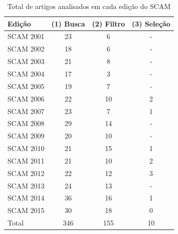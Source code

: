 \begin{table}[H]
\caption{Total de artigos analisados em cada edição do SCAM}
\centering
\begin{tabular}{| l | c | c | c |}
\hline
Edição & (1) Busca & (2) Filtro & (3) Seleção \\
\hline
SCAM 2001 & 23    & 6         & -           \\
SCAM 2002 & 18    & 6         & -           \\
SCAM 2003 & 21    & 8         & -           \\
SCAM 2004 & 17    & 3         & -           \\
SCAM 2005 & 19    & 7         & -           \\
SCAM 2006 & 22    & 10        & 2           \\
SCAM 2007 & 23    & 7         & 1           \\
SCAM 2008 & 29    & 14        & -           \\
SCAM 2009 & 20    & 10        & -           \\
SCAM 2010 & 21    & 15        & 1           \\
SCAM 2011 & 21    & 10        & 2           \\
SCAM 2012 & 22    & 12        & 3           \\
SCAM 2013 & 24    & 13        & -           \\
SCAM 2014 & 36    & 16        & 1           \\
SCAM 2015 & 30    & 18        & 0           \\
\hline
Total     & 346   & 155       & 10          \\
\hline
\end{tabular}
\label{artigos-do-scam}
\end{table}

